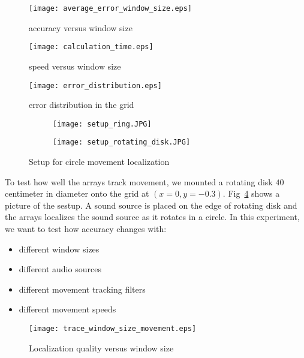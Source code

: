 \begin{figure}[]
\texttt{[image: average\_error\_window\_size.eps]}
\caption{accuracy versus window size}
\label{fig:accuracy_vs_window}
\end{figure}

\begin{figure}[]
\texttt{[image: calculation\_time.eps]}
\caption{speed versus window size}
\label{fig:speed_vs_window}
\end{figure}


\begin{figure}[]
\texttt{[image: error\_distribution.eps]}
\caption{error distribution in the grid}
\label{fig:error_distribution}
\end{figure}

\begin{figure}[]
  \centering
  \begin{subfigure}[]{.2\textwidth}
    \texttt{[image: setup\_ring.JPG]}
  \end{subfigure}
  \begin{subfigure}[]{.2\textwidth}
    \texttt{[image: setup\_rotating\_disk.JPG]}
  \end{subfigure}
  \caption{Setup for circle movement localization}
  \label{fig:setup_circle}
\end{figure}


To test how well the arrays track movement, we mounted a rotating disk $40$ centimeter in diameter onto the grid at $(x=0, y=-0.3)$. Fig~\ref{fig:setup_circle} shows a picture of the sestup. A sound source is placed on the edge of rotating disk and the arrays localizes the sound source as it rotates in a circle. In this experiment, we want to test how accuracy changes with:
\begin{itemize}
\item different window sizes
\item different audio sources
\item different movement tracking filters
\item different movement speeds
\end{itemize}


\begin{figure*}[]
\centering
  \texttt{[image: trace\_window\_size\_movement.eps]}
\caption{Localization quality versus window size}\label{fig:wn}
\label{fig:trace_win_circle}
\end{figure*}

